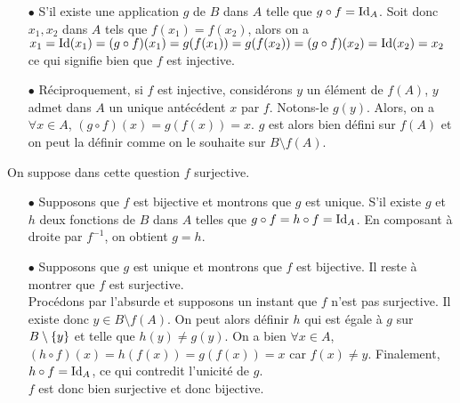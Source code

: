 \documentclass{magnolia}
\begin{document}
\begin{sol}
\begin{questions}
\begin{questions}
\begin{itemize}
  
  \end{itemize}
  \end{questions}
\question
  \begin{questions}
  \question \begin{itemize}
  \item[$\bullet$]S'il existe une application $g$ de $B$ dans $A$ telle que $g\circ f=\operatorname{Id}_{A}$. 
   Soit donc $x_1,x_2$ dans $A$ tels que $f(x_1)=f(x_2)$, alors on a $x_1=\operatorname{Id}(x_1)=(g\circ f) (x_1)=g(f(x_1))=g(f(x_2))=(g\circ f) (x_2)=\operatorname{Id}(x_2)=x_2$ ce qui signifie bien que $f$ est injective.\\
  
  \item[$\bullet$]Réciproquement, si $f$ est injective, considérons $y$ un élément de $f(A)$, $y$ admet dans $A$ un unique antécédent $x$ par $f$. Notons-le $g(y)$. Alors, on a $\forall x \in A$, $(g\circ f)(x)=g(f(x))=x$. $g$ est alors bien défini sur $f(A)$ et on peut la définir comme on le souhaite sur $B\setminus f(A)$.
  \end{itemize}
  \question On suppose dans cette question $f$ surjective.
  \begin{itemize}
  \item[$\bullet$]Supposons que $f$ est bijective et montrons que $g$ est unique.
  S'il existe $g$ et $h$ deux fonctions de $B$ dans $A$ telles que $g\circ f=h\circ f=\operatorname{Id}_{A}$. En composant à droite par $f^{-1}$, on obtient $g=h$. 
  \item[$\bullet$]Supposons que $g$ est unique et montrons que $f$ est bijective.
  Il reste à montrer que $f$ est surjective.\\
  Procédons par l'absurde et supposons un instant que $f$ n'est pas surjective. Il existe donc $y\in B\setminus f(A)$. On peut alors définir $h$ qui est égale à $g$ sur $B\setminus\left\{y\right\}$ et telle que $h(y)\neq g(y)$. On a bien $\forall x\in A$, $(h\circ f)(x)=h(f(x))=g(f(x))=x$ car $f(x)\neq y$. Finalement, $h\circ f=\operatorname{Id}_{A}$, ce qui contredit l'unicité de $g$.\\
  $f$ est donc bien surjective et donc bijective.
  
  
  \end{itemize}
\end{questions}
\end{questions}
\end{sol}
\end{document}
